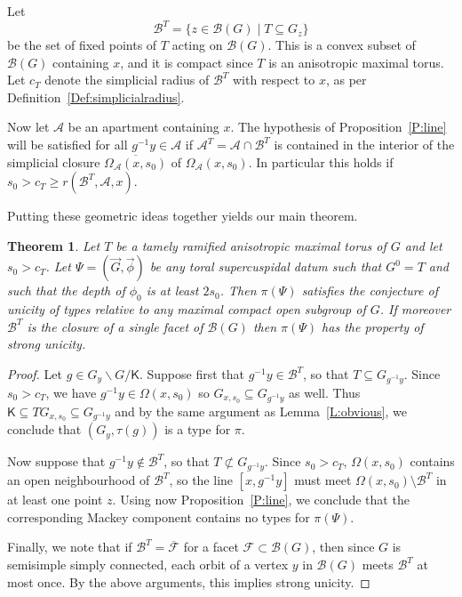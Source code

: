 \documentclass[12pt]{amsart}
\newcommand{\Bset}{\Omega}
\newcommand{\apart}{{\mathcal{A}}}
\newcommand{\Aset}{\Omega_{\apart}}
\newcommand{\buil}{\mathcal{B}}
\newcommand{\F}{\mathcal{F}} %
\newcommand{\KT}{\mathsf{K}}
\theoremstyle{plain}
\newtheorem{theorem}{Theorem}[section]
\theoremstyle{definition}
\theoremstyle{remark}
\numberwithin{equation}{section}
\numberwithin{figure}{section}
\begin{document}
Let 
$$
\buil^T = \{z\in \buil(G) \mid T\subseteq G_z\}
$$
be the set of fixed points of $T$ acting on $\buil(G)$.  This is a convex subset of $\buil(G)$ containing $x$, and it is compact since $T$ is an anisotropic  maximal  torus.   Let $c_T$ denote the simplicial radius of $\buil^T$ with respect to $x$, as per Definition~\ref{Def:simplicialradius}.

Now let $\apart$ be an apartment containing $x$.  The hypothesis of Proposition~\ref{P:line} will be satisfied for all $g^{-1}y\in \apart$ if $\apart^T=\apart \cap \buil^T$ is contained in the interior of the simplicial closure $\overline{\Aset(x,s_0)}$ of $\Aset(x,s_0)$.   In particular this holds if $s_0> c_T \geq r(\buil^T,\apart,x)$.  

Putting these geometric ideas together yields our main theorem.

\begin{theorem}\label{T:unicity}
Let $T$ be a tamely ramified  anisotropic maximal torus of $G$ and let $s_0>c_T$.  Let $\Psi = (\vec{G},\vec{\phi})$ be any toral supercuspidal datum such that $G^0=T$ and such that the depth of $\phi_0$ is at least $2s_0$.  Then $\pi(\Psi)$ satisfies the conjecture of unicity of types relative to any maximal compact open subgroup of $G$.  If moreover $\buil^T$ is the closure of a single facet of $\buil(G)$ then $\pi(\Psi)$ has the property of strong unicity.
\end{theorem}

\begin{proof}
Let $g\in G_y\backslash G / \KT$.  Suppose first that $g^{-1}y \in \buil^T$, so that $T\subseteq G_{g^{-1}y}$.  Since $s_0>c_T$, we have $g^{-1}y \in \Bset(x,s_0)$ so $G_{x,s_0}\subseteq G_{g^{-1}y}$ as well.  Thus $\KT \subseteq TG_{x,s_0} \subseteq G_{g^{-1}y}$ and by the same argument as 
Lemma~\ref{L:obvious}, we conclude that $(G_{y},\tau(g))$ is a type for $\pi$.

Now suppose that $g^{-1}y \notin \buil^T$, so that $T \not\subset G_{g^{-1}y}$.  
Since $s_0>c_T$,  $\Bset(x,s_0)$ contains an open neighbourhood of $\buil^T$, so the line $[x,g^{-1}y]$ must meet $\Bset(x,s_0) \setminus \buil^T$ in at least one point $z$.  Using now Proposition~\ref{P:line}, we conclude that the corresponding Mackey component contains no types for $\pi(\Psi)$.

Finally, we note that if $\buil^T = \overline{\F}$ for a facet $\F\subset\buil(G)$, then since $G$ is semisimple simply connected, each orbit of a vertex $y$ in $\buil(G)$ meets $\buil^T$ at most once.  By the above arguments, this implies strong unicity.
\end{proof}
\end{document}
